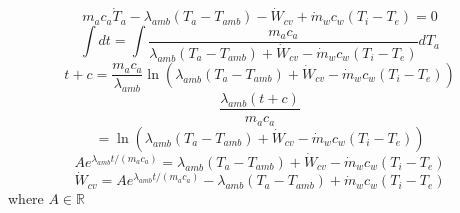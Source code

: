 \documentclass[10pt,a4paper]{IEEEtran}
\begin{document}
	$$m_a c_a \dot{T}_a - \lambda_{amb} \left( T_a - T_{amb} \right) - \dot{W}_{cv} + \dot{m}_w c_w \left( T_i - T_e \right) = 0$$
	$$\int dt = \int \frac{m_a c_a}{\lambda_{amb} \left( T_a - T_{amb} \right) + \dot{W}_{cv} - \dot{m}_w c_w \left( T_i - T_e \right)} dT_a$$
	$$t+ c = \frac{m_a c_a}{\lambda_{amb}} \ln(\lambda_{amb} \left( T_a - T_{amb} \right) + \dot{W}_{cv} - \dot{m}_w c_w \left( T_i - T_e \right))$$
	$$\frac{\lambda_{amb} \left( t + c \right)}{m_a c_a}$$  
	$$= \ln(\lambda_{amb} \left( T_a - T_{amb} \right) + \dot{W}_{cv} - \dot{m}_w c_w \left( T_i - T_e \right))$$
	$$Ae^{\lambda_{amb} t/(m_a c_a)} = \lambda_{amb} \left( T_a - T_{amb} \right) + \dot{W}_{cv} - \dot{m}_w c_w \left( T_i - T_e \right)$$
	$$\dot{W}_{cv} = Ae^{\lambda_{amb} t/(m_a c_a)} - \lambda_{amb} \left( T_a - T_{amb} \right) + \dot{m}_w c_w \left( T_i - T_e \right)$$
	where $A \in \mathbb{R}$
\end{document}
